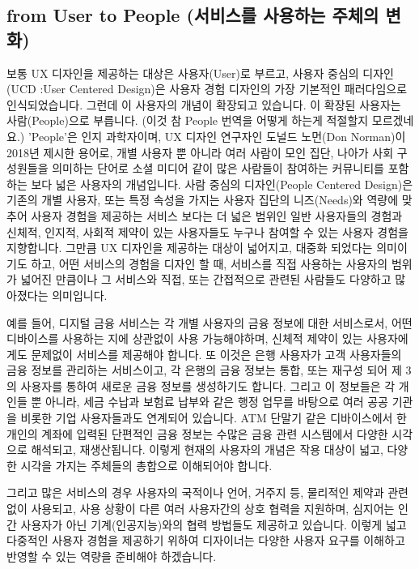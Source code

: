 \documentclass[
  letterpaper,
]{book}
\begin{document}
\subsection{from User to People (서비스를 사용하는 주체의
변화)}\label{from-user-to-people-uxc11cuxbe44uxc2a4uxb97c-uxc0acuxc6a9uxd558uxb294-uxc8fcuxccb4uxc758-uxbcc0uxd654}

보통 UX 디자인을 제공하는 대상은 사용자(User)로 부르고, 사용자 중심의
디자인(UCD :User Centered Design)은 사용자 경험 디자인의 가장 기본적인
패러다임으로 인식되었습니다. 그런데 이 사용자의 개념이 확장되고
있습니다. 이 확장된 사용자는 사람(People)으로 부릅니다. (이것 참 People
번역을 어떻게 하는게 적절할지 모르겠네요.) 'People'은 인지 과학자이며,
UX 디자인 연구자인 도널드 노먼(Don Norman)이 2018년 제시한 용어로, 개별
사용자 뿐 아니라 여러 사람이 모인 집단, 나아가 사회 구성원들을 의미하는
단어로 소셜 미디어 같이 많은 사람들이 참여하는 커뮤니티를 포함하는 보다
넓은 사용자의 개념입니다. 사람 중심의 디자인(People Centered Design)은
기존의 개별 사용자, 또는 특정 속성을 가지는 사용자 집단의 니즈(Needs)와
역량에 맞추어 사용자 경험을 제공하는 서비스 보다는 더 넓은 범위인 일반
사용자들의 경험과 신체적, 인지적, 사회적 제약이 있는 사용자들도 누구나
참여할 수 있는 사용자 경험을 지향합니다. 그만큼 UX 디자인을 제공하는
대상이 넓어지고, 대중화 되었다는 의미이기도 하고, 어떤 서비스의 경험을
디자인 할 때, 서비스를 직접 사용하는 사용자의 범위가 넓어진 만큼이나 그
서비스와 직접, 또는 간접적으로 관련된 사람들도 다양하고 많아졌다는
의미입니다.

예를 들어, 디지털 금융 서비스는 각 개별 사용자의 금융 정보에 대한
서비스로서, 어떤 디바이스를 사용하는 지에 상관없이 사용 가능해야하며,
신체적 제약이 있는 사용자에게도 문제없이 서비스를 제공해야 합니다. 또
이것은 은행 사용자가 고객 사용자들의 금융 정보를 관리하는 서비스이고, 각
은행의 금융 정보는 통합, 또는 재구성 되어 제 3의 사용자를 통하여 새로운
금융 정보를 생성하기도 합니다. 그리고 이 정보들은 각 개인들 뿐 아니라,
세금 수납과 보험료 납부와 같은 행정 업무를 바탕으로 여러 공공 기관을
비롯한 기업 사용자들과도 연계되어 있습니다. ATM 단말기 같은 디바이스에서
한 개인의 계좌에 입력된 단편적인 금융 정보는 수많은 금융 관련 시스템에서
다양한 시각으로 해석되고, 재생산됩니다. 이렇게 현재의 사용자의 개념은
작용 대상이 넓고, 다양한 시각을 가지는 주체들의 총합으로 이해되어야
합니다.

그리고 많은 서비스의 경우 사용자의 국적이나 언어, 거주지 등, 물리적인
제약과 관련 없이 사용되고, 사용 상황이 다른 여러 사용자간의 상호 협력을
지원하며, 심지어는 인간 사용자가 아닌 기계(인공지능)와의 협력 방법들도
제공하고 있습니다. 이렇게 넓고 다중적인 사용자 경험을 제공하기 위하여
디자이너는 다양한 사용자 요구를 이해하고 반영할 수 있는 역량을 준비해야
하겠습니다.
\end{document}
